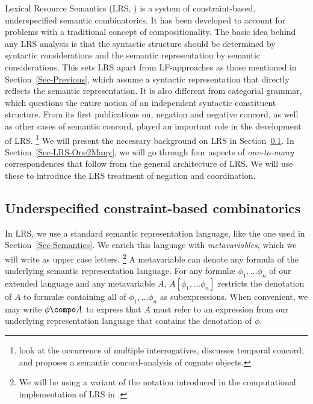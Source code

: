 \documentclass[output=paper]{langsci/langscibook}
\begin{document}
Lexical Resource Semantics (LRS, \citealt{Richter:Sailer:04}) is a system of constraint-based, underspecified semantic combinatorics.
It has been developed to account for problems with a traditional concept of compositionality. 
The basic idea behind any LRS analysis is that the syntactic structure should be determined by syntactic considerations and the semantic representation by semantic considerations. 
This sets LRS apart from LF-approaches as those mentioned in Section~\ref{Sec-Previous}, which assume a syntactic representation that directly reflects the semantic representation. It is also different from categorial grammar, which questions the entire notion of an independent syntactic constituent structure.
From its first publications on, negation and negative concord, as well as other cases of semantic concord, played an important role in the development of LRS.%
\footnote{\citet{Richter:Sailer:01.1} look at the occurrence of multiple interrogatives, 
\citet{Sailer:04.sub} discusses temporal concord, and \citet{Sailer:10} proposes a semantic concord-analysis of cognate objects.
}
We will present the necessary background on LRS in Section~\ref{Sec-LRS-Basics}. 
In Section~\ref{Sec-LRS-One2Many}, we will go through four aspects of \emph{one-to-many} correspondences that follow from the general architecture of LRS. We will use these to introduce the LRS treatment of negation and coordination. 

\subsection{Underspecified constraint-based combinatorics}
\label{Sec-LRS-Basics}

In LRS, we use a standard semantic representation language, like the one used in Section~\ref{Sec-Semantics}. 
We enrich this language with \emph{metavariables}, which we will write as upper case letters.%
\footnote{We will be using a variant of the notation introduced in the computational implementation of LRS in \citet{Penn:Richter:04,Penn:Richter:05}.}
A metavariable can denote any formula of the underlying semantic representation language.
For any formul\ae{} $\phi_1, \ldots \phi_n$ of our extended language and any metavariable $A$, $A[\phi_1, \ldots \phi_n]$ restricts the denotation of $A$ to formul\ae{} containing all of $\phi_1, \ldots \phi_n$ as subexpressions. 
When convenient, we may write $\phi \compo A$ to express that $A$ must refer to an expression from our underlying representation language that contains the denotation of $\phi$.
\end{document}

